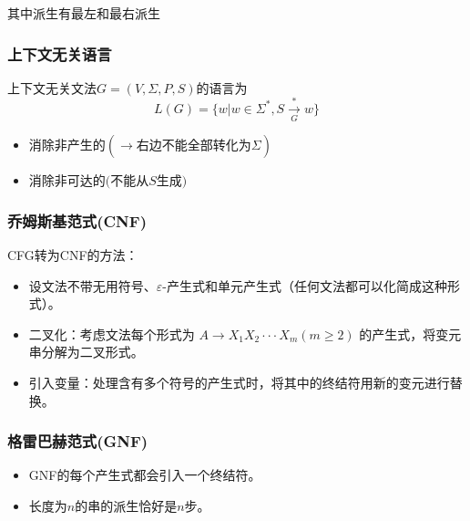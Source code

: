 \documentclass{article}
\begin{document}
其中派生有最左和最右派生
\subsubsection{上下文无关语言}
上下文无关文法$G = (V, \Sigma, P, S)$的语言为
\[
    L(G) = \{w | w \in \Sigma^*, S\xrightarrow[G]{*} w \}
\]
\begin{itemize}
    \item 消除非产生的$(\xrightarrow[]{}\text{右边不能全部转化为}\Sigma)$
    \item 消除非可达的$($不能从$S$生成$)$
\end{itemize}

\subsubsection{乔姆斯基范式(CNF)}
CFG转为CNF的方法：
\begin{itemize}
    \item 设文法不带无用符号、$\varepsilon$-产生式和单元产生式（任何文法都可以化简成这种形式）。
    \item 二叉化：考虑文法每个形式为 $A\rightarrow X_{1}X_{2}\cdot\cdot\cdot X_{m}(m\ge2)$ 的产生式，将变元串分解为二叉形式。
    \item 引入变量：处理含有多个符号的产生式时，将其中的终结符用新的变元进行替换。
\end{itemize}

\subsubsection{格雷巴赫范式(GNF)}
\begin{itemize}
    \item GNF的每个产生式都会引入一个终结符。
    \item 长度为$n$的串的派生恰好是$n$步。
\end{itemize}

\end{document}
